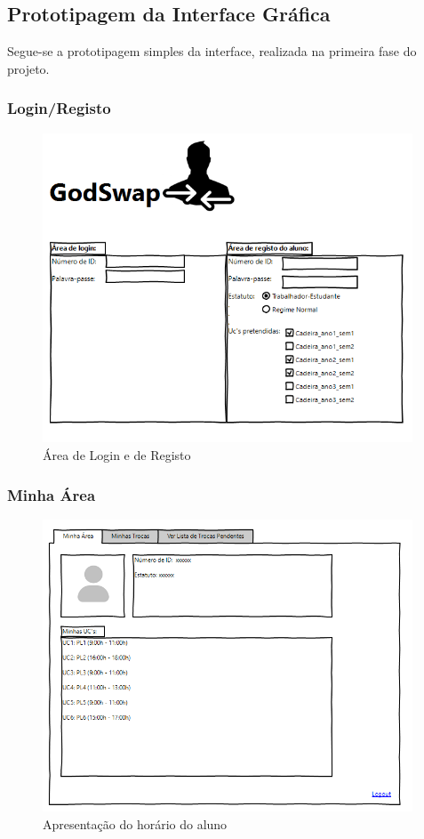 \documentclass[a4paper]{article}
\begin{document}
\subsection{Prototipagem da Interface Gráfica}
\hspace{3mm} Segue-se a prototipagem simples da interface, realizada na primeira fase do projeto.

\subsubsection{Login/Registo}
\begin{figure}[H]
\centering
\includegraphics[width=11cm]{interface_1}
\caption{Área de Login e de Registo}
\label{}
\end{figure}


\subsubsection{Minha Área}
\begin{figure}[H]
\centering
\includegraphics[width=11cm]{interface_2}
\caption{Apresentação do horário do aluno}
\label{}
\end{figure}
\end{document}
